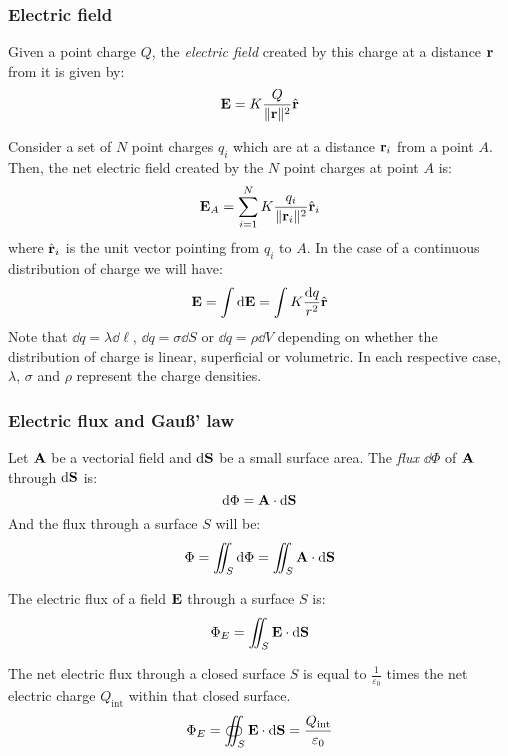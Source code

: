 \documentclass[../../../main.tex]{subfiles}
\begin{document}
\begin{multicols}{2}
  \subsubsection{Electric field}
  \begin{definition}
    Given a point charge $Q$, the \textit{electric field} created by this charge at a distance $\boldsymbol{\mathrm{r}}$ from it is given by:
    $$\boldsymbol{\mathrm{E}}=K\frac{Q}{\|\boldsymbol{\mathrm{r}}\|^2}\hat{\boldsymbol{\mathrm{r}}}$$
  \end{definition}
  \begin{principle}
    Consider a set of $N$ point charges $q_i$ which are at a distance $\boldsymbol{\mathrm{r}}_i$ from a point $A$. Then, the net electric field created by the $N$ point charges at point $A$ is:
    $$\boldsymbol{\mathrm{E}}_A=\sum_{i=1}^NK\frac{q_i}{\|\boldsymbol{\mathrm{r}}_{i}\|^2}\hat{\boldsymbol{\mathrm{r}}}_{i}$$ where $\hat{\boldsymbol{\mathrm{r}}}_{i}$ is the unit vector pointing from $q_i$ to $A$. In the case of a continuous distribution of charge we will have:
    $$\boldsymbol{\mathrm{E}}=\int\dd\boldsymbol{\mathrm{E}}=\int K\frac{\dd q}{r^2}\hat{\boldsymbol{\mathrm{r}}}$$
    Note that $\dd q=\lambda\dd \ell$, $\dd q=\sigma\dd S$ or $\dd q=\rho\dd V$ depending on whether the distribution of charge is linear, superficial or volumetric. In each respective case, $\lambda$, $\sigma$ and $\rho$ represent the charge densities.
  \end{principle}
  \subsubsection{Electric flux and Gau\ss' law}
  \begin{definition}
    Let $\boldsymbol{\mathrm{A}}$ be a vectorial field and $\dd\boldsymbol{\mathrm{S}}$ be a small surface area. The \textit{flux $\dd \Phi$} of $\boldsymbol{\mathrm{A}}$ through $\dd \boldsymbol{\mathrm{S}}$ is:
    $$\dd \Phi=\boldsymbol{\mathrm{A}}\cdot\dd\boldsymbol{\mathrm{S}}$$ And the flux through a surface $S$ will be:
    $$\Phi=\iint_S \dd\Phi=\iint_S\boldsymbol{\mathrm{A}}\cdot \dd\boldsymbol{\mathrm{S}}$$
  \end{definition}
  \begin{corollary}
    The electric flux of a field $\boldsymbol{\mathrm{E}}$ through a surface $S$ is:
    $$\Phi_E=\iint_S\boldsymbol{\mathrm{E}}\cdot \dd\boldsymbol{\mathrm{S}}$$
  \end{corollary}
  \begin{law}
    The net electric flux through a closed surface $S$ is equal to $\frac{1}{\varepsilon_0}$ times the net electric charge $Q_\text{int}$ within that closed surface.
    $$\Phi_E=\oiint_S\boldsymbol{\mathrm{E}}\cdot\dd\boldsymbol{\mathrm{S}}=\frac{Q_\text{int}}{\varepsilon_0}$$
  \end{law}

\end{multicols}
\end{document}
